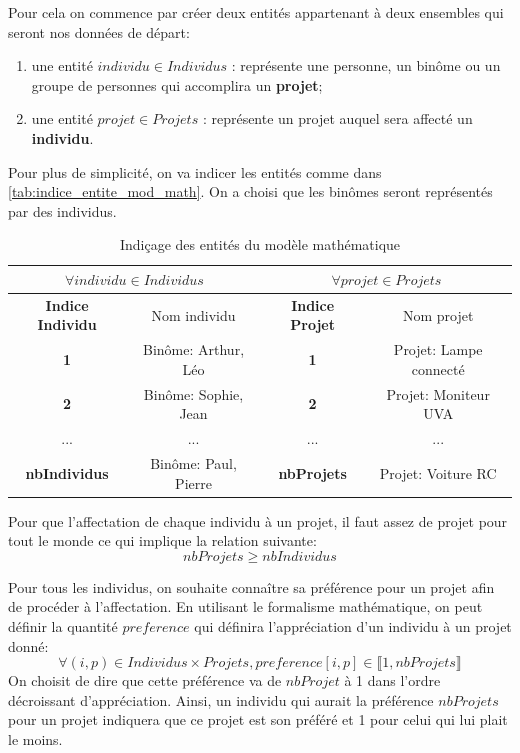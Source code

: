 \documentclass[final,poster]{polytech/polytech}
\begin{document}
Pour cela on commence par créer deux entités appartenant à deux ensembles qui seront nos données de départ:
\begin{enumerate}
\item une entité $individu \in Individus$ : représente une personne, un binôme ou un groupe de personnes qui accomplira un \textbf{projet};
\item une entité  $projet \in Projets$ : représente un projet auquel sera affecté un \textbf{individu}.
\end{enumerate}

Pour plus de simplicité, on va indicer les entités comme dans \autoref{tab:indice_entite_mod_math}. On a choisi que les binômes seront représentés par des individus.
\begin{table}
\caption{\label{tab:indice_entite_mod_math}Indiçage des entités du modèle mathématique}
\begin{tabular}{|c|c|c|c|}
\hline
\multicolumn{2}{|c|}{$\forall individu \in Individus$} & \multicolumn{2}{|c|}{$\forall projet \in Projets$} \\
\hline
\textbf{Indice Individu} & Nom individu &\textbf{ Indice Projet} & Nom projet \\
\hline
\textbf{1} & Binôme: Arthur, Léo & \textbf{1} & Projet: Lampe connecté \\
\hline
\textbf{2} & Binôme: Sophie, Jean & \textbf{2} & Projet: Moniteur UVA \\
\hline
... & ... & ... & ... \\
\hline
\textbf{nbIndividus} & Binôme: Paul, Pierre &\textbf{ nbProjets} & Projet: Voiture RC \\
\hline
\end{tabular}
\end{table}

Pour que l'affectation de chaque individu à un projet, il faut assez de projet pour tout le monde ce qui implique la relation suivante:
$$ nbProjets \geqslant nbIndividus$$

Pour tous les individus, on souhaite connaître sa préférence pour un projet afin de procéder à l'affectation. En utilisant le formalisme mathématique, on peut définir la quantité $preference$ qui définira l'appréciation d'un individu à un projet donné:
$$
\forall (i,p) \in Individus \times Projets,
preference[i,p] \in \llbracket 1, nbProjets \rrbracket
$$
On choisit de dire que cette préférence va de $nbProjet$ à 1 dans l'ordre décroissant d'appréciation. Ainsi, un individu qui aurait la préférence $nbProjets$ pour un projet indiquera que ce projet est son préféré et 1 pour celui qui lui plait le moins.
\end{document}

